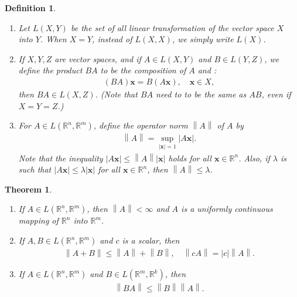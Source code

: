 \documentclass[10pt]{book}
\newtheorem{definition}{Definition}[chapter]
\newtheorem{theorem}{Theorem}[chapter]
\theoremstyle{definition}
\numberwithin{equation}{chapter}
\begin{document}
\medskip

\begin{definition}\label{def_74}
~\begin{enumerate}[label=(\alph*)]
    \item Let $L(X,Y)$ be the set of all linear transformation of the vector space $X$ into $Y$. When $X = Y$, instead of $L(X,X)$, we simply write $L(X)$. 
    
    \item If $X,Y,Z$ are vector spaces, and if $A \in L(X,Y)$ and $B \in L(Y,Z)$, we define the product $BA$ to be the composition of $A$ and :
    \begin{align*}
        (BA)\mathbf{x} = B(A\mathbf{x}), \quad \mathbf{x} \in X,
    \end{align*}
    then $BA \in L(X,Z)$. (Note that $BA$ need to to be the same as $AB$, even if $X = Y = Z$.)
    
    \item For $A \in L(\mathbb{R}^n,\mathbb{R}^m)$, define the operator norm $\left\|A\right\|$ of $A$ by
    \begin{align*}
        \left\|A\right\| = \sup_{\left|\mathbf{x}\right|=1} \left|A\mathbf{x}\right|.
    \end{align*}
    Note that the inequality $\left|A\mathbf{x}\right| \leq \left\|A\right\| \left|\mathbf{x}\right|$ holds for all $\mathbf{x} \in \mathbb{R}^n$. Also, if $\lambda$ is such that $\left|A\mathbf{x}\right| \leq \lambda \left|\mathbf{x}\right|$ for all $\mathbf{x} \in \mathbb{R}^n$, then $\left\|A\right\| \leq \lambda$.
\end{enumerate}
\end{definition}

\medskip

\begin{theorem}
~\begin{enumerate}[label=(\alph*)]
    \item If $A \in L(\mathbb{R}^n,\mathbb{R}^m)$, then $\left\|A\right\| < \infty$ and $A$ is a uniformly continuous mapping of $\mathbb{R}^n$ into $\mathbb{R}^m$.
    
    \item If $A, B \in L(\mathbb{R}^n,\mathbb{R}^m)$ and $c$ is a scalar, then
    \begin{align*}
        \left\|A + B\right\| \leq \left\|A\right\| + \left\|B\right\|, \quad \left\|cA\right\| = \left|c\right| \left\|A\right\|.
    \end{align*}
    
    \item If $A \in L(\mathbb{R}^n,\mathbb{R}^m)$ and $B \in L(\mathbb{R}^m,\mathbb{R}^k)$, then
    \begin{align*}
        \left\|BA\right\| \leq \left\|B\right\| \left\|A\right\|.
    \end{align*}
\end{enumerate}
\end{theorem}
\end{document}
